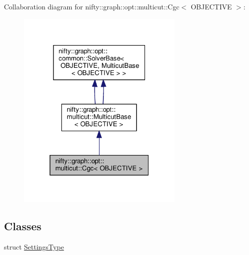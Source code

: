 Collaboration diagram for nifty\+:\+:graph\+:\+:opt\+:\+:multicut\+:\+:Cgc$<$ O\+B\+J\+E\+C\+T\+I\+VE $>$\+:
\nopagebreak
\begin{figure}[H]
\begin{center}
\leavevmode
\includegraphics[width=229pt]{classnifty_1_1graph_1_1opt_1_1multicut_1_1Cgc__coll__graph}
\end{center}
\end{figure}
\subsection*{Classes}
\begin{DoxyCompactItemize}
\item 
struct \hyperlink{structnifty_1_1graph_1_1opt_1_1multicut_1_1Cgc_1_1SettingsType}{Settings\+Type}
\end{DoxyCompactItemize}
